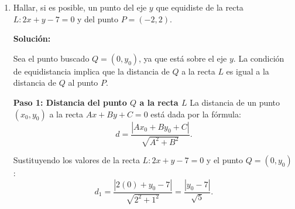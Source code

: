 \documentclass[11pt]{article}
\newcommand{\indicador}[4]{
{\tikz[remember picture,overlay]\coordinate (#1) at #2;}{\tikz[remember picture,overlay]\coordinate (#3) at #4;} 
}
\newcommand{\marka}[2]{
{\tikz[remember picture,overlay]\coordinate (#1) at #2;}
}
\begin{document}
\begin{enumerate}[\hspace{-5mm} 1) ]
\begin{enumerate}[(a)]
 

$
\left\{
\begin{array}{rl}
y= -\frac{1}{2}x + &\!  \frac{5}{2}   \marka{a}{(.1,.25)}
\\[5mm]
 2x + 4y + 4 &= 0 \indicador{b}{(.1,.15)}{c}{(.6,.65)} \marka{d}{(1.3,.65)}
\end{array}
\right.
$



\vspace{9mm}
 Por lo tanto, no existe un punto sobre esta recta que equidiste de $A$ y $B$.
 

\end{enumerate}












  \item  Hallar, si es posible, un punto del eje $y$ que equidiste de la recta $L : 2x + y - 7 = 0$ y del punto $P = (-2,2)$.


\textbf{Solución:}

Sea el punto buscado $Q = (0, y_0)$, ya que está sobre el eje $y$. La condición de equidistancia implica que la distancia de $Q$ a la recta $L$ es igual a la distancia de $Q$ al punto $P$.

\textbf{Paso 1: Distancia del punto $Q$ a la recta $L$}
La distancia de un punto $(x_0, y_0)$ a la recta $Ax + By + C = 0$ está dada por la fórmula:
\[
    d = \frac{|Ax_0 + By_0 + C|}{\sqrt{A^2 + B^2}}.
\]

Sustituyendo los valores de la recta $L: 2x + y - 7 = 0$ y el punto $Q = (0, y_0)$:
\[
    d_1 = \frac{|2(0) + y_0 - 7|}{\sqrt{2^2 + 1^2}} = \frac{|y_0 - 7|}{\sqrt{5}}.
\]


\end{enumerate}
\end{document}
